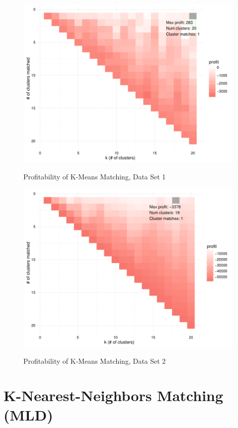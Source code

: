 \begin{figure}[!htb]
  \centering
  \caption{Profitability of K-Means Matching, Data Set 1}
  \includegraphics[scale=.5]{kmeans_profit1.pdf}
  \label{fig:kmeans_profit1}
\end{figure}

\begin{figure}[!htb]
  \centering
  \caption{Profitability of K-Means Matching, Data Set 2}
  \includegraphics[scale=.5]{kmeans_profit2.pdf}
  \label{fig:kmeans_profit2}
\end{figure}

\section{K-Nearest-Neighbors Matching (MLD)}

